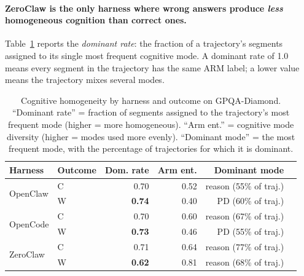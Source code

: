 \paragraph{ZeroClaw is the only harness where wrong answers produce
\emph{less} homogeneous cognition than correct ones.}

Table~\ref{tab:arm-dominance} reports the \emph{dominant rate}: the fraction
of a trajectory's segments assigned to its single most frequent cognitive
mode.
A dominant rate of 1.0 means every segment in the trajectory has the same
ARM label; a lower value means the trajectory mixes several modes.

\begin{table}[t]
\centering
\small
\caption{%
  Cognitive homogeneity by harness and outcome on GPQA-Diamond.
  ``Dominant rate'' = fraction of segments assigned to the trajectory's most
  frequent mode (higher = more homogeneous).
  ``Arm ent.'' = cognitive mode diversity (higher = modes used more evenly).
  ``Dominant mode'' = the most frequent mode, with the percentage of
  trajectories for which it is dominant.
}
\label{tab:arm-dominance}
\setlength{\tabcolsep}{3.5pt}
\begin{tabular}{llrrrl}
\toprule
Harness & Outcome & Dom. rate & Arm ent. & Dominant mode & \\
\midrule
\multirow{2}{*}{OpenClaw}
  & C & 0.70 & 0.52 & reason (55\% of traj.) \\
  & W & \textbf{0.74} & 0.40 & PD (60\% of traj.)    \\
\midrule
\multirow{2}{*}{OpenCode}
  & C & 0.70 & 0.60 & reason (67\% of traj.) \\
  & W & \textbf{0.73} & 0.46 & PD (55\% of traj.)    \\
\midrule
\multirow{2}{*}{ZeroClaw}
  & C & 0.71 & 0.64 & reason (77\% of traj.) \\
  & W & \textbf{0.62} & 0.81 & reason (68\% of traj.) \\
\bottomrule
\end{tabular}
\end{table}


